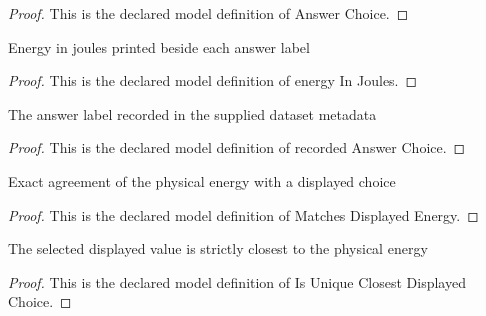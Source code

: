 \begin{proof}
  This is the declared model definition of Answer Choice.
\end{proof}
\begin{definition}
  \label{def:physics:phyx-mini-0280:phyxminiproblems-problemphyxmini0280-answerchoice-energyinjoules}
  Energy in joules printed beside each answer label
\end{definition}
\begin{proof}
  This is the declared model definition of energy In Joules.
\end{proof}
\begin{definition}
  \label{def:physics:phyx-mini-0280:phyxminiproblems-problemphyxmini0280-recordedanswerchoice}
  The answer label recorded in the supplied dataset metadata
\end{definition}
\begin{proof}
  This is the declared model definition of recorded Answer Choice.
\end{proof}
\begin{definition}
  \label{def:physics:phyx-mini-0280:phyxminiproblems-problemphyxmini0280-matchesdisplayedenergy}
  Exact agreement of the physical energy with a displayed choice
\end{definition}
\begin{proof}
  This is the declared model definition of Matches Displayed Energy.
\end{proof}
\begin{definition}
  \label{def:physics:phyx-mini-0280:phyxminiproblems-problemphyxmini0280-isuniqueclosestdisplayedchoice}
  The selected displayed value is strictly closest to the physical energy
\end{definition}
\begin{proof}
  This is the declared model definition of Is Unique Closest Displayed Choice.
\end{proof}
